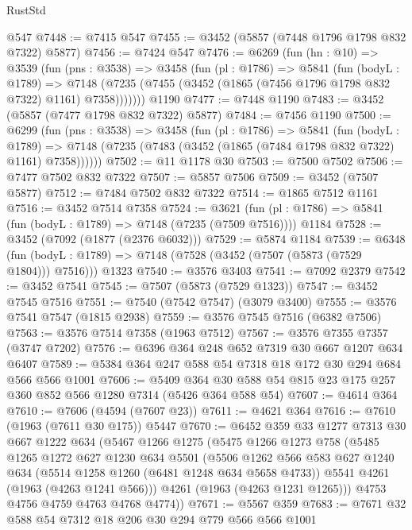 \begin{lexlean}{RustStd}
\begin{coremodule}
    @547
@7448 := @7415 @547
@7455 := @3452 (@5857 (@7448 @1796 @1798 @832 @7322) @5877)
@7456 := @7424 @547
@7476 := @6269
    (fun (hn : @10) =>
    @3539
      (fun (pns : @3538) =>
      @3458
        (fun (pl : @1786) =>
        @5841
          (fun (bodyL : @1789) =>
          @7148 (@7235 (@7455 (@3452 (@1865 (@7456 @1796 @1798 @832 @7322) @1161) @7358)))))))
    @1190
@7477 := @7448 @1190
@7483 := @3452 (@5857 (@7477 @1798 @832 @7322) @5877)
@7484 := @7456 @1190
@7500 := @6299
    (fun (pns : @3538) =>
    @3458
      (fun (pl : @1786) =>
      @5841
        (fun (bodyL : @1789) =>
        @7148 (@7235 (@7483 (@3452 (@1865 (@7484 @1798 @832 @7322) @1161) @7358))))))
@7502 := @11 @1178 @30
@7503 := @7500 @7502
@7506 := @7477 @7502 @832 @7322
@7507 := @5857 @7506
@7509 := @3452 (@7507 @5877)
@7512 := @7484 @7502 @832 @7322
@7514 := @1865 @7512 @1161
@7516 := @3452 @7514 @7358
@7524 := @3621
    (fun (pl : @1786) => @5841 (fun (bodyL : @1789) => @7148 (@7235 (@7509 @7516))))
    @1184
@7528 := @3452 (@7092 (@1877 (@2376 @6032)))
@7529 := @5874 @1184
@7539 := @6348
    (fun (bodyL : @1789) => @7148 (@7528 (@3452 (@7507 (@5873 (@7529 @1804))) @7516)))
    @1323
@7540 := @3576 @3403
@7541 := @7092 @2379
@7542 := @3452 @7541
@7545 := @7507 (@5873 (@7529 @1323))
@7547 := @3452 @7545 @7516
@7551 := @7540 (@7542 @7547) (@3079 @3400)
@7555 := @3576 @7541 @7547 (@1815 @2938)
@7559 := @3576 @7545 @7516 (@6382 @7506)
@7563 := @3576 @7514 @7358 (@1963 @7512)
@7567 := @3576 @7355 @7357 (@3747 @7202)
@7576 := @6396 @364 @248 @652 @7319 @30 @667 @1207 @634 @6407
@7589 := @5384 @364 @247 @588 @54 @7318 @18 @172 @30 @294 @684 @566 @566 @1001
@7606 := @5409 @364 @30 @588 @54 @815 @23 @175 @257 @360 @852 @566 @1280 @7314 (@5426 @364 @588 @54)
@7607 := @4614 @364
@7610 := @7606 (@4594 (@7607 @23))
@7611 := @4621 @364
@7616 := @7610 (@1963 (@7611 @30 @175)) @5447
@7670 := @6452
    @359
    @33
    @1277
    @7313
    @30
    @667
    @1222
    @634
    (@5467
      @1266
      @1275
      (@5475
        @1266
        @1273
        @758
        (@5485
          @1265
          @1272
          @627
          @1230
          @634
          @5501
          (@5506
            @1262
            @566
            @583
            @627
            @1240
            @634
            (@5514 @1258 @1260 (@6481 @1248 @634 @5658 @4733))
            @5541
            @4261
            (@1963 (@4263 @1241 @566)))
          @4261
          (@1963 (@4263 @1231 @1265)))
        @4753
        @4756
        @4759
        @4763
        @4768
        @4774))
@7671 := @5567 @359
@7683 := @7671 @32 @588 @54 @7312 @18 @206 @30 @294 @779 @566 @566 @1001

\end{coremodule}
\end{lexlean}
